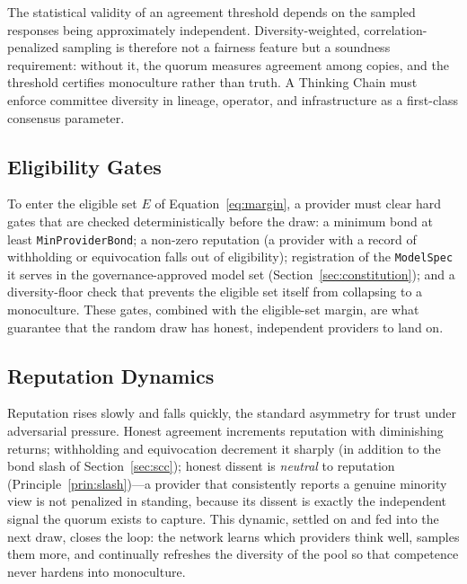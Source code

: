 \begin{principle}
\label{prin:diversity}
The statistical validity of an \SCC{} agreement threshold depends on the sampled responses being approximately independent. Diversity-weighted, correlation-penalized sampling is therefore not a fairness feature but a soundness requirement: without it, the quorum measures agreement among copies, and the threshold certifies monoculture rather than truth. A Thinking Chain must enforce committee diversity in lineage, operator, and infrastructure as a first-class consensus parameter.
\end{principle}

\subsection{Eligibility Gates}

To enter the eligible set $E$ of Equation~\ref{eq:margin}, a provider must clear hard gates that are checked deterministically before the draw: a minimum bond at least \texttt{MinProviderBond}; a non-zero reputation (a provider with a record of withholding or equivocation falls out of eligibility); registration of the \texttt{ModelSpec} it serves in the governance-approved model set (Section~\ref{sec:constitution}); and a diversity-floor check that prevents the eligible set itself from collapsing to a monoculture. These gates, combined with the eligible-set margin, are what guarantee that the random draw has honest, independent providers to land on.

\subsection{Reputation Dynamics}

Reputation rises slowly and falls quickly, the standard asymmetry for trust under adversarial pressure. Honest agreement increments reputation with diminishing returns; withholding and equivocation decrement it sharply (in addition to the bond slash of Section~\ref{sec:scc}); honest dissent is \emph{neutral} to reputation (Principle~\ref{prin:slash})---a provider that consistently reports a genuine minority view is not penalized in standing, because its dissent is exactly the independent signal the quorum exists to capture. This dynamic, settled on \RChain{} and fed into the next draw, closes the loop: the network learns which providers think well, samples them more, and continually refreshes the diversity of the pool so that competence never hardens into monoculture.

